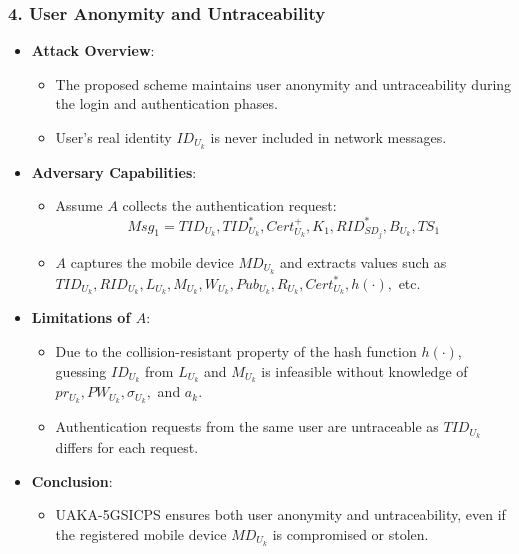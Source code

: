 \documentclass[9pt,handout]{beamer}
\begin{document}
\begin{frame}
    \frametitle{4. User Anonymity and Untraceability}
    \begin{itemize}
        \item \textbf{Attack Overview}:
            \begin{itemize}
                \item The proposed scheme maintains user anonymity and untraceability during the login and authentication phases.
                \item User's real identity \( ID_{U_k} \) is never included in network messages.
            \end{itemize}
        \item \textbf{Adversary Capabilities}:
            \begin{itemize}
                \item Assume \( A \) collects the authentication request:
                \[
                Msg_1 = TID_{U_k}, TID^{*}_{U_k}, Cert^{+}_{U_k}, K_1, RID^{*}_{SD_j}, B_{U_k}, TS_1
                \]
                \item \( A \) captures the mobile device \( MD_{U_k} \) and extracts values such as \( TID_{U_k}, RID_{U_k}, L_{U_k}, M_{U_k}, W_{U_k}, Pub_{U_k}, R_{U_k}, Cert^{*}_{U_k}, h(\cdot), \) etc.
            \end{itemize}
        \item \textbf{Limitations of \( A \)}:
            \begin{itemize}
                \item Due to the collision-resistant property of the hash function \( h(\cdot) \), guessing \( ID_{U_k} \) from \( L_{U_k} \) and \( M_{U_k} \) is infeasible without knowledge of \( pr_{U_k}, PW_{U_k}, \sigma_{U_k}, \) and \( a_k \).
                \item Authentication requests from the same user are untraceable as \( TID_{U_k} \) differs for each request.
            \end{itemize}
        \item \textbf{Conclusion}:
            \begin{itemize}
                \item UAKA-5GSICPS ensures both user anonymity and untraceability, even if the registered mobile device \( MD_{U_k} \) is compromised or stolen.
            \end{itemize}
    \end{itemize}
\end{frame}
\end{document}
